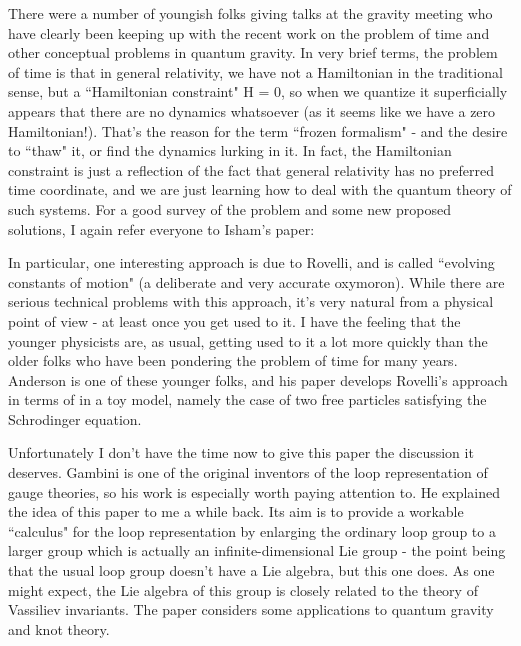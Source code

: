 

There were a number of youngish folks giving talks at the gravity meeting who have clearly been keeping up with the recent work on the problem of time and other conceptual problems in quantum gravity. In very brief terms, the problem of time is that in general relativity, we have not a Hamiltonian in the traditional sense, but a ``Hamiltonian constraint" H = 0, so when we quantize it superficially appears that there are no dynamics whatsoever (as it seems like we have a zero Hamiltonian!). That's the reason for the term ``frozen formalism" - and the desire to ``thaw" it, or find the dynamics lurking in it. In fact, the Hamiltonian constraint is just a reflection of the fact that general relativity has no preferred time coordinate, and we are just learning how to deal with the quantum theory of such systems. For a good survey of the problem and some new proposed solutions, I again refer everyone to Isham's paper:


In particular, one interesting approach is due to Rovelli, and is called ``evolving constants of motion" (a deliberate and very accurate oxymoron). While there are serious technical problems with this approach, it's very natural from a physical point of view - at least once you get used to it. I have the feeling that the younger physicists are, as usual, getting used to it a lot more quickly than the older folks who have been pondering the problem of time for many years. Anderson is one of these younger folks, and his paper develops Rovelli's approach in terms of in a toy model, namely the case of two free particles satisfying the Schrodinger equation.


Unfortunately I don't have the time now to give this paper the discussion it deserves. Gambini is one of the original inventors of the loop representation of gauge theories, so his work is especially worth paying attention to. He explained the idea of this paper to me a while back. Its aim is to provide a workable ``calculus" for the loop representation by enlarging the ordinary loop group to a larger group which is actually an infinite-dimensional Lie group - the point being that the usual loop group doesn't have a Lie algebra, but this one does. As one might expect, the Lie algebra of this group is closely related to the theory of Vassiliev invariants. The paper considers some applications to quantum gravity and knot theory. 



